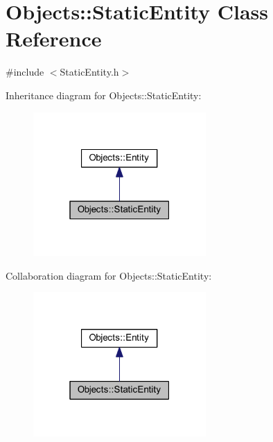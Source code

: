 \hypertarget{class_objects_1_1_static_entity}{}\section{Objects\+:\+:Static\+Entity Class Reference}
\label{class_objects_1_1_static_entity}


{\ttfamily \#include $<$Static\+Entity.\+h$>$}



Inheritance diagram for Objects\+:\+:Static\+Entity\+:
\nopagebreak
\begin{figure}[H]
\begin{center}
\leavevmode
\includegraphics[width=187pt]{class_objects_1_1_static_entity__inherit__graph}
\end{center}
\end{figure}


Collaboration diagram for Objects\+:\+:Static\+Entity\+:
\nopagebreak
\begin{figure}[H]
\begin{center}
\leavevmode
\includegraphics[width=187pt]{class_objects_1_1_static_entity__coll__graph}
\end{center}
\end{figure}
